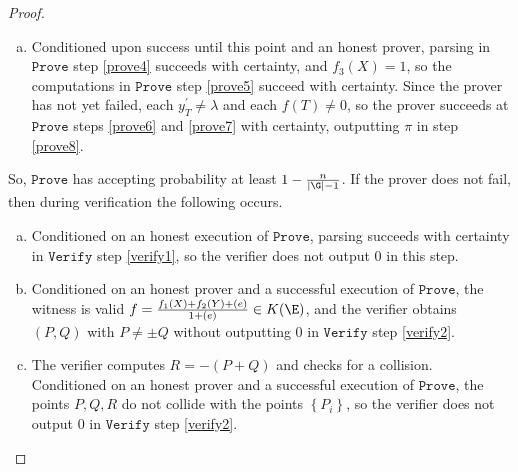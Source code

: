 \documentclass[11pt,letterpaper]{article}
\theoremstyle{definition}
\newcommand{\6}{\mathbf}
\newcommand{\7}{\mathcal}
\begin{document}
\begin{proof}
\begin{enumerate}[(a)]
\item Conditioned upon success until this point and an honest prover, parsing in $\texttt{Prove}$ step \ref{prove4} succeeds with certainty, and $f_3(X) = 1$, so the computations in $\texttt{Prove}$ step \ref{prove5} succeed with certainty. Since the prover has not yet failed, each $y_T^\prime \neq \lambda$ and each $f(T) \neq 0$, so the prover succeeds at $\texttt{Prove}$ steps \ref{prove6} and \ref{prove7} with certainty, outputting $\pi$ in step \ref{prove8}.
\end{enumerate}


So, $\texttt{Prove}$ has accepting probability at least $1 - \frac{n}{\left|\G\right| - 1}$. If the prover does not fail, then during verification the following occurs.
\begin{enumerate}[(a)]
\item Conditioned on an honest execution of $\texttt{Prove}$, parsing succeeds with certainty in $\texttt{Verify}$ step \ref{verify1}, so the verifier does not output $0$ in this step.
\item Conditioned on an honest prover and a successful execution of $\texttt{Prove}$, the witness is valid $f = \frac{f_1(X) + f_2(Y) + (e)}{1+(e)} \in K(\E)$, and the verifier obtains $(P, Q)$ with $P \neq \pm Q$ without outputting $0$ in $\texttt{Verify}$ step \ref{verify2}.
\item The verifier computes $R = -(P+Q)$ and checks for a collision. Conditioned on an honest prover and a successful execution of $\texttt{Prove}$,  the points $P, Q, R$ do not collide with the points $\left\{P_i\right\}$, so the verifier does not output $0$ in $\texttt{Verify}$ step \ref{verify2}.


\end{enumerate}
\end{proof}
\end{document}
